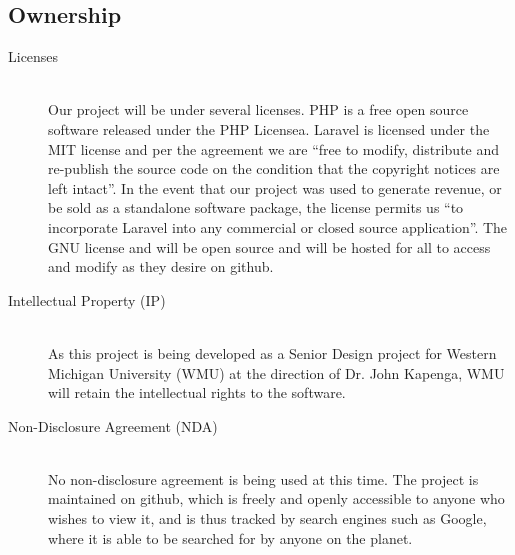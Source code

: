 \documentclass{report}
\begin{document}
\subsection*{Ownership}
\begin{description}
\item [Licenses] \hfill \\
Our project will be under several licenses. PHP is a free open source software released under the PHP Licensea.
Laravel is licensed under the MIT license and per the agreement we are “free to modify, distribute and re-publish the source code on the condition that the copyright notices are left intact”.
In the event that our project was used to generate revenue, or be sold as a standalone software package, the license permits us “to incorporate Laravel into any commercial or closed source application”.  
The GNU license and will be open source and will be hosted for all to access and modify as they desire on github.
\item [Intellectual Property (IP)] \hfill \\
As this project is being developed as a Senior Design project for Western Michigan University (WMU) at the direction of Dr. John Kapenga, WMU will retain the intellectual rights to the software.
\item [Non-Disclosure Agreement (NDA)] \hfill \\
No non-disclosure agreement is being used at this time.  The project is maintained on github, which is freely and openly accessible to anyone who wishes to view it, and is thus tracked by search engines such as Google, where it is able to be searched for by anyone on the planet.
\end{description}
\end{document}
